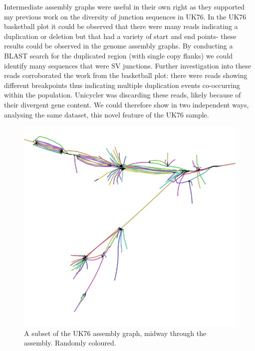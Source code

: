 \documentclass{article}
\begin{document}
Intermediate assembly graphs were useful in their own right as they supported my previous work on the diversity of junction sequences in UK76.  In the UK76 basketball plot it could be observed that there were many reads indicating a duplication or deletion but that had a variety of start and end points- these results could be observed in the genome assembly graphs. By conducting a BLAST search for the duplicated region (with single copy flanks) we could identify many sequences that were SV junctions. Further investigation into these reads corroborated the work from the basketball plot: there were reads showing different breakpoints thus indicating multiple duplication events co-occurring within the population. Unicycler was discarding these reads, likely because of their divergent gene content. We could therefore show in two independent ways, analysing the same dataset, this novel feature of the UK76 sample. 



\begin{figure}[h!]
\centering
\includegraphics[width=\textwidth{}]{Chapter_1/graph.png}
\caption{ A subset of the UK76 assembly graph, midway through the assembly. Randomly coloured.}
\label{fig:MDR_Man_PC3}
\end{figure}
\end{document}
